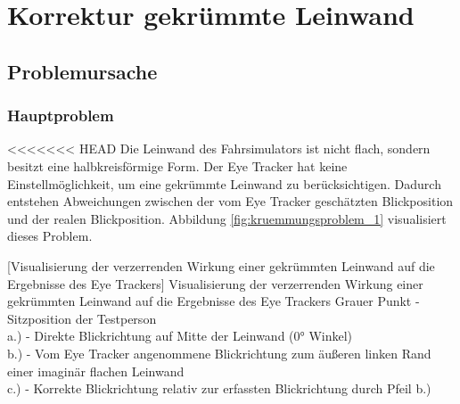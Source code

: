 \chapter{Korrektur gekrümmte Leinwand}
\label{sec:korrektur gekrümmte leinwand}

\section{Problemursache}
\subsection{Hauptproblem}
<<<<<<< HEAD
Die Leinwand des Fahrsimulators ist nicht flach, sondern besitzt eine halbkreisförmige Form. Der Eye Tracker hat keine Einstellmöglichkeit, um eine gekrümmte Leinwand zu berücksichtigen. Dadurch entstehen Abweichungen zwischen der vom Eye Tracker geschätzten Blickposition und der realen Blickposition. Abbildung \ref{fig:kruemmungsproblem_1} visualisiert dieses Problem. 




\begin{center}
	[Visualisierung der verzerrenden Wirkung einer gekrümmten Leinwand auf die Ergebnisse des Eye Trackers]
	{Visualisierung der verzerrenden Wirkung einer gekrümmten Leinwand auf die Ergebnisse des Eye Trackers}
	\captionsetup{justification=justified, singlelinecheck=false}
	{\footnotesize Grauer Punkt - Sitzposition der Testperson\\
	a.) - Direkte Blickrichtung auf Mitte der Leinwand (0° Winkel)\\
	b.) - Vom Eye Tracker angenommene Blickrichtung zum äußeren linken Rand einer imaginär flachen Leinwand\\
	c.) - Korrekte Blickrichtung relativ zur erfassten Blickrichtung durch Pfeil b.)
	}
 \label{fig:kruemmungsproblem_1}
\end{center}

